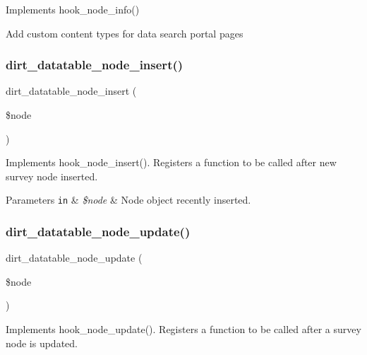 Implements hook\+\_\+node\+\_\+info()

Add custom content types for data search portal pages \mbox{\label{dirt__datatable_8module_a5d23fdebd313b13e508170c1ed5835c4}} 
\subsubsection{\texorpdfstring{dirt\+\_\+datatable\+\_\+node\+\_\+insert()}{dirt\_datatable\_node\_insert()}}
{\footnotesize\ttfamily dirt\+\_\+datatable\+\_\+node\+\_\+insert (\begin{DoxyParamCaption}\item[{}]{\$node }\end{DoxyParamCaption})}

Implements hook\+\_\+node\+\_\+insert(). Registers a function to be called after new survey node inserted.


\begin{DoxyParams}[1]{Parameters}
\mbox{\tt in}  & {\em \$node} & Node object recently inserted. \\
\hline
\end{DoxyParams}
\mbox{\label{dirt__datatable_8module_a743da8ebbeace0d1b0153531fbe35396}} 
\subsubsection{\texorpdfstring{dirt\+\_\+datatable\+\_\+node\+\_\+update()}{dirt\_datatable\_node\_update()}}
{\footnotesize\ttfamily dirt\+\_\+datatable\+\_\+node\+\_\+update (\begin{DoxyParamCaption}\item[{}]{\$node }\end{DoxyParamCaption})}

Implements hook\+\_\+node\+\_\+update(). Registers a function to be called after a survey node is updated.


